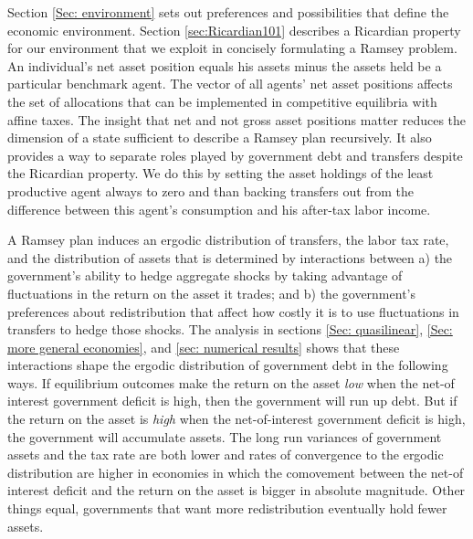 \documentclass[thmsb,11pt]{article}
\begin{document}
%
%

Section \ref{Sec: environment} sets out  preferences and possibilities that define the economic environment.
Section \ref{sec:Ricardian101}
describes a  Ricardian property for our environment that we  exploit in concisely formulating a Ramsey problem.
An individual's net asset position equals his  assets minus 
the assets held be a particular benchmark agent. The vector of all agents' net asset positions  affects the set of allocations that can be implemented
in competitive equilibria with affine taxes.
The  insight that net and not gross asset positions matter reduces the dimension of a state sufficient 
to describe a Ramsey plan recursively. It also provides a way  to separate roles played by   government debt and transfers despite
the Ricardian property.  We do this by setting the asset holdings of the least productive agent always  to  zero and than backing transfers 
out from the difference  between this agent's  consumption and  his after-tax labor income. 



A Ramsey plan induces an ergodic distribution of transfers,   the labor tax rate, and the distribution of assets that is
  determined by interactions between
a) the government's  ability to hedge aggregate shocks by taking advantage of fluctuations in  the return on the asset it trades;
and b) the government's preferences about  redistribution that affect how costly it is to use fluctuations in transfers to hedge those shocks.
The analysis in sections \ref{Sec: quasilinear}, \ref{Sec: more general economies}, and \ref{sec: numerical results}
shows that these interactions  shape  the ergodic distribution of government debt in the following ways.
If equilibrium outcomes make the  return on the asset {\em low} when the net-of interest government deficit is high,
then the government will  run up  debt.  %
But if the return on the asset is {\em high} when the net-of-interest government deficit is high, the
 government will accumulate assets.
  The long run variances of government assets and the tax rate are both lower and  rates of convergence to the ergodic distribution are
higher in economies in which the comovement between the net-of interest deficit and  the return on  the asset is bigger in absolute magnitude.
 Other things equal, governments that want more redistribution eventually hold fewer assets.
\end{document}
